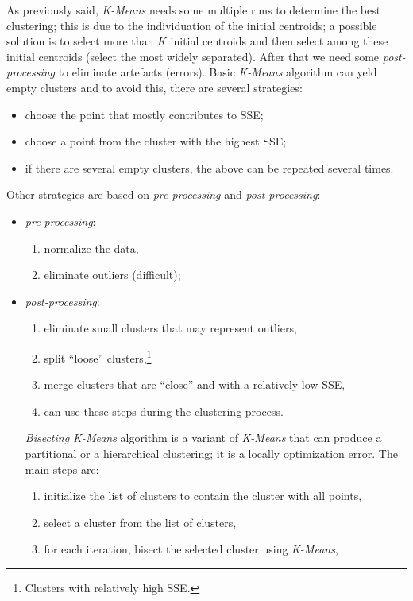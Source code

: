 \begin{description}
	As previously said, \emph{K-Means} needs some multiple runs to determine the best clustering; this is due to the individuation of the initial centroids; a possible solution is to select more than $K$ initial centroids and then select among these initial centroids (select the most widely separated).
	After that we need some \emph{post-processing} to eliminate artefacts (errors).
	Basic \emph{K-Means} algorithm can yeld empty clusters and to avoid this, there are several strategies:
	\begin{itemize}
		\item
		choose the point that mostly contributes to SSE;
		\item
		choose a point from the cluster with the highest SSE;
		\item
		if there are several empty clusters, the above can be repeated several times.
	\end{itemize}
	Other strategies are based on \emph{pre-processing} and \emph{post-processing}:
	\begin{itemize}
		\item
		\emph{pre-processing}:
		\begin{enumerate}
			\item
			normalize the data,
			\item
			eliminate outliers (difficult);
		\end{enumerate}
		\item
		\emph{post-processing}:
		\begin{enumerate}
			\item
			eliminate small clusters that may represent outliers,
			\item
			split ``loose'' clusters,\footnote{Clusters with relatively high SSE.}
			\item
			merge clusters that are ``close'' and with a relatively low SSE,
			\item
			can use these steps during the clustering process.
		\end{enumerate}
		\emph{Bisecting K-Means} algorithm is a variant of \emph{K-Means} that can produce a partitional or a hierarchical clustering; it is a locally optimization error.
		The main steps are:
		\begin{enumerate}
			\item
			initialize the list of clusters to contain the cluster with all points,
			\item
			select a cluster from the list of clusters,
			\item
			for each iteration, bisect the selected cluster using \emph{K-Means},

\end{enumerate}
\end{itemize}
\end{description}
